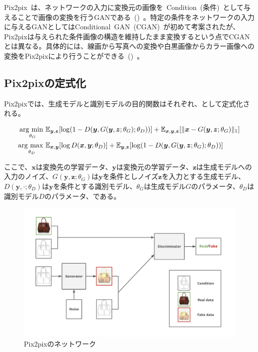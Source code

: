 Pix2pix~\cite{pix2pix}は、ネットワークの入力に変換元の画像を~Condition~(条件)~として与えることで画像の変換を行うGANである~()~。特定の条件をネットワークの入力に与えるGANとしてはConditional~GAN~(CGAN)~\cite{CGAN}が初めて考案されたが、Pix2pixは与えられた条件画像の構造を維持したまま変換するという点でCGANとは異なる。具体的には、線画から写真への変換や白黒画像からカラー画像への変換をPix2pixにより行うことができる~()~。

\subsection{Pix2pixの定式化}

Pix2pixでは、生成モデルと識別モデルの目的関数はそれぞれ、として定式化される。

\begin{align}
    \label{eq:pix2pix_G}
    \mathop{\mathrm{arg~min~}}\limits _{\theta_G}& \mathbb{E}_{\boldsymbol{y}, \boldsymbol{z}}[\log (1-D(\boldsymbol{y}, G(\boldsymbol{y}, \boldsymbol{z}; \theta_G); \theta_D))]+\mathbb{E}_{\boldsymbol{x}, \boldsymbol{y}, \boldsymbol{z}}[\|\boldsymbol{x}-G(\boldsymbol{y}, \boldsymbol{z}; \theta_G)\|_{1}]\\
    \label{eq:pix2pix_D}
    \mathop{\mathrm{arg~max~}}\limits _{\theta_D}& \mathbb{E}_{\boldsymbol{x}, \boldsymbol{y}}[\log D(\boldsymbol{x}, \boldsymbol{y}; \theta_D)]+\mathbb{E}_{\boldsymbol{y}, \boldsymbol{z}}[\log (1-D(\boldsymbol{y}, G(\boldsymbol{y}, \boldsymbol{z}; \theta_G); \theta_D))]
\end{align}

ここで、$\boldsymbol{x}$は変換先の学習データ、$\boldsymbol{y}$は変換元の学習データ、$\boldsymbol{z}$は生成モデルへの入力のノイズ、$G(\boldsymbol{y},\boldsymbol{z};\theta_G)$は$\boldsymbol{y}$を条件としノイズ$\boldsymbol{z}$を入力とする生成モデル、$D(\boldsymbol{y},\cdot;\theta_D)$は$\boldsymbol{y}$を条件とする識別モデル、$\theta_G$は生成モデル$G$のパラメータ、$\theta_D$は識別モデル$D$のパラメータ、である。

\begin{figure}[b]
\centering
\includegraphics[width=0.75\columnwidth]{figure/pix2pix_net.png}
\caption[Pix2pixのネットワーク]{Pix2pixのネットワーク}
\label{fig:pix2pix_net}
\end{figure}

